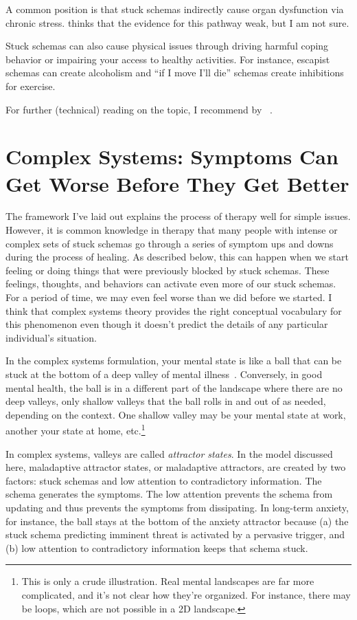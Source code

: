 \documentclass[11pt,oneside]{book}
\let\cite\parencite
\newcommand{\prosecite}[1]{\citetitle{#1} by \citefullauthor{#1}~\cite{#1}}
\begin{document}
A common position is that stuck schemas indirectly cause organ dysfunction via chronic stress. \textcite{berghPsychogenic} thinks that the evidence for this pathway weak, but I am not sure.

Stuck schemas can also cause physical issues through driving harmful coping behavior or impairing your access to healthy activities. For instance, escapist schemas can create alcoholism and \enquote{if I move I'll die} schemas create inhibitions for exercise.

For further (technical) reading on the topic, I recommend \prosecite{berghPsychogenic}.

\section{Complex Systems: Symptoms Can Get Worse Before They Get Better}
\label{sec:complex}
The framework I've laid out explains the process of therapy well for simple issues. However, it is common knowledge in therapy that many people with intense or complex sets of stuck schemas go through a series of symptom ups and downs during the process of healing. As described below, this can happen when we start feeling or doing things that were previously blocked by stuck schemas. These feelings, thoughts, and behaviors can activate even more of our stuck schemas. For a period of time, we may even feel worse than we did before we started. I think that complex systems theory provides the right conceptual vocabulary for this phenomenon even though it doesn't predict the details of any particular individual's situation.

In the complex systems formulation, your mental state is like a ball that can be stuck at the bottom of a deep valley of mental illness~\cite{hayes2020complex}. Conversely, in good mental health, the ball is in a different part of the landscape where there are no deep valleys, only shallow valleys that the ball rolls in and out of as needed, depending on the context. One shallow valley may be your mental state at work, another your state at home, etc.\footnote{This is only a crude illustration. Real mental landscapes are far more complicated, and it's not clear how they're organized. For instance, there may be loops, which are not possible in a 2D landscape.}

In complex systems, valleys are called \textit{attractor states}. In the model discussed here, maladaptive attractor states, or maladaptive attractors, are created by two factors: stuck schemas and low attention to contradictory information. The schema generates the symptoms. The low attention prevents the schema from updating and thus prevents the symptoms from dissipating. In long-term anxiety, for instance, the ball stays at the bottom of the anxiety attractor because (a) the stuck schema predicting imminent threat is activated by a pervasive trigger, and (b) low attention to contradictory information keeps that schema stuck.
\end{document}
